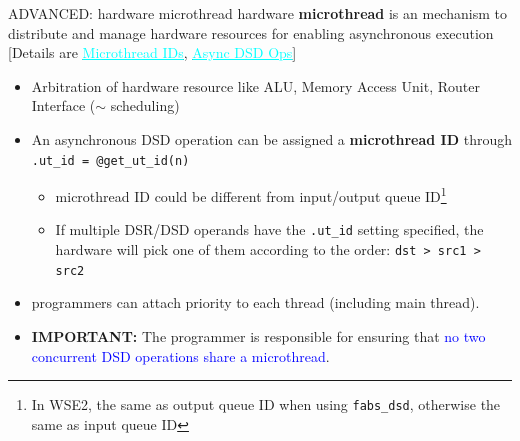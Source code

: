 \documentclass[dvipdfmx, 11pt, aspectratio=169]{beamer}   %
\newcommand{\ulhref}[2]{\href{#1}{\textcolor{cyan}{\uline{#2}}}}
\begin{document}
\begin{frame}[fragile]{ADVANCED: hardware microthread}
hardware \textbf{microthread} is an mechanism to distribute and manage hardware resources for enabling asynchronous execution
[Details are \ulhref{https://sdk.cerebras.net/csl/language/microthreads_wse3}{Microthread IDs}, \ulhref{https://sdk.cerebras.net/csl/language/dsds\#language-dsds-async}{Async DSD Ops}]
\vspace{-0.3\baselineskip}
\begin{itemize}
    \item Arbitration of hardware resource like ALU, Memory Access Unit, Router Interface ($\sim$ scheduling)
    \item An asynchronous DSD operation can be assigned a \textbf{microthread ID} through \lstinline|.ut_id = @get_ut_id(n)|
    \begin{itemize}
        \item microthread ID could be different from input/output queue ID\footnote{In WSE2, the same as output queue ID when using \lstinline|fabs_dsd|, otherwise the same as input queue ID}
        \item If multiple DSR/DSD operands have the \lstinline|.ut_id| setting specified, the hardware will pick one of them according to the order: \lstinline|dst > src1 > src2|
    \end{itemize}
    \item programmers can attach priority to each thread (including main thread). 
    \item \textbf{IMPORTANT: } The programmer is responsible for ensuring that \textcolor{blue}{no two concurrent DSD operations share a microthread}.
\end{itemize}
\end{frame}
\end{document}
